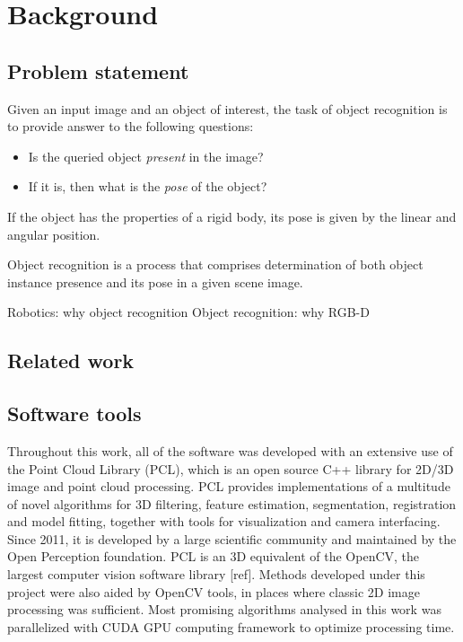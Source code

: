 \chapter{Background}
\label{cha:background}




\section{Problem statement}
\label{sec:problem}

Given an input image and an object of interest, the task of object recognition is to provide answer to the following questions:
\begin{itemize}
\item Is the queried object \textit{present} in the image?
\item If it is, then what is the \textit{pose} of the object?
\end{itemize}
If the object has the properties of a rigid body, its pose is given by the linear and angular position.


Object recognition is a process that comprises determination of both object instance presence and its pose in a given scene image.   

Robotics: why object recognition
Object recognition: why RGB-D




\section{Related work}
\label{sec:related}



\section{Software tools}
\label{sec:software}

Throughout this work, all of the software was developed with an extensive use of the Point Cloud Library (PCL)\cite{Rusu_ICRA2011_PCL}, which is an open source C++ library for 2D/3D image and point cloud processing. PCL provides implementations of  a multitude of novel algorithms for 3D filtering, feature estimation, segmentation, registration and model fitting, together with tools for visualization and camera interfacing. Since 2011, it is developed by a large scientific community and maintained by the Open Perception foundation. PCL is an 3D equivalent of the OpenCV, the largest computer vision software library [ref]. Methods developed under this project were also aided by OpenCV tools, in places where classic 2D image processing was sufficient.
Most promising algorithms analysed in this work was parallelized with CUDA GPU  computing framework to optimize processing time.





